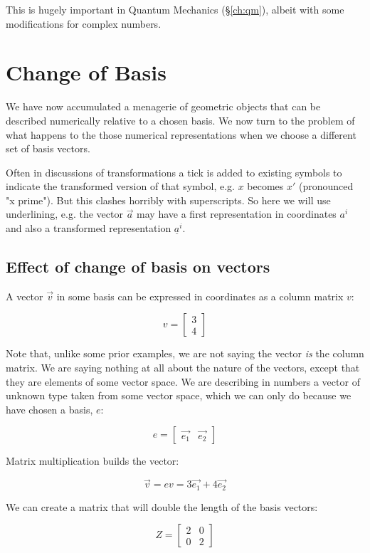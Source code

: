 This is hugely important in Quantum Mechanics (§\ref{ch:qm}), albeit with some modifications for complex numbers.

\section{Change of Basis}\label{sec:vectors-change-basis}

We have now accumulated a menagerie of geometric objects that can be described numerically relative to a chosen basis. We now turn to the problem of what happens to the those numerical representations when we choose a different set of basis vectors.

Often in discussions of transformations a tick is added to existing symbols to indicate the transformed version of that symbol, e.g. $x$ becomes $x'$ (pronounced "x prime"). But this clashes horribly with superscripts. So here we will use underlining, e.g. the vector $\vec{a}$ may have a first representation in coordinates $a^i$ and also a transformed representation $\underline{a}^i$.

\subsection{Effect of change of basis on vectors}

A vector $\vec{v}$ in some basis can be expressed in coordinates as a column matrix $v$:

$$v = \begin{bmatrix}3 \\ 4\end{bmatrix}$$

Note that, unlike some prior examples, we are not saying the vector \textit{is} the column matrix. We are saying nothing at all about the nature of the vectors, except that they are elements of some vector space. We are describing in numbers a vector of unknown type taken from some vector space, which we can only do because we have chosen a basis, $e$:

$$e = \begin{bmatrix}\vec{e_1} & \vec{e_2}\end{bmatrix}$$

Matrix multiplication builds the vector:

$$\vec{v} = ev = 3\vec{e_1} + 4\vec{e_2}$$

We can create a matrix that will double the length of the basis vectors:

$$Z = \begin{bmatrix}2 & 0 \\ 0 & 2\end{bmatrix}$$

